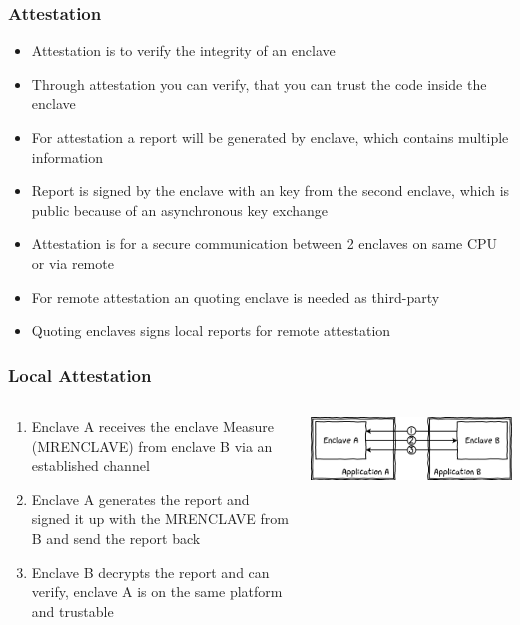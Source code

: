 \begin{frame}
    \frametitle{Attestation}
    \begin{itemize}[<+->]
        \item Attestation is to verify the integrity of an enclave
        \item Through attestation you can verify, that you can trust the code inside the enclave
        \item For attestation a report will be generated by enclave, which contains multiple information
        \item Report is signed by the enclave with an key from the second enclave, which is public because of an asynchronous key exchange
        \item Attestation is for a secure communication between 2 enclaves on same CPU or via remote 
        \item For remote attestation an quoting enclave is needed as third-party
        \item Quoting enclaves signs local reports for remote attestation
    \end{itemize}
\end{frame}

\begin{frame}
    \frametitle{Local Attestation}
    \begin{columns}
        \begin{column}{0.4\textwidth}
            \begin{enumerate}[<+->]
                \item Enclave A receives the enclave Measure (MRENCLAVE) from enclave B via an established channel
                \item Enclave A generates the report and signed it up with the MRENCLAVE from B and send the report back
                \item Enclave B decrypts the report and can verify, enclave A is on the same platform and trustable
            \end{enumerate}
        \end{column}
        \begin{column}{0.6\textwidth}
            \includegraphics[scale=0.45]{Images/local_attestation.png}
        \end{column}
    \end{columns}
\end{frame}


